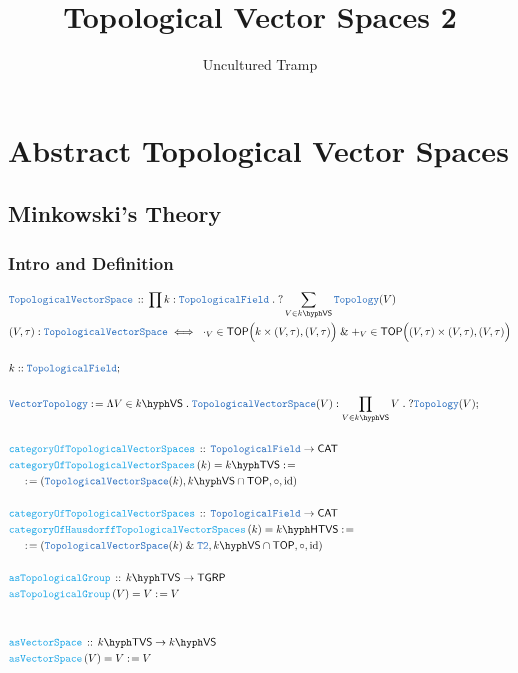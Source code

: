 \documentclass[12pt]{scrartcl}
\title{Topological Vector Spaces 2}
\author{Uncultured Tramp}
\newcommand{\TYPE}[1]{\textcolor{NavyBlue}{\mathtt{#1}}}
\newcommand{\FUNC}[1]{\textcolor{Cerulean}{\mathtt{#1}}}
\renewcommand{\.}{\; . \;}
\newcommand{\de}{: \kern 0.1pc =}
\newcommand{\Act}[1]{\left( #1 \right)}
\newcommand{\DeclareType}[2]{& \TYPE{#1} \, :: \, #2 \\}
\newcommand{\DefineType}[3]{& #1 : \TYPE{#2} \iff #3 \\}
\newcommand{\DeclareFunc}[2]{& \FUNC{#1} \, :: \, #2 \\}
\newcommand{\DefineNamedFunc}[4]{&  \FUNC{#1}\Act{#2} = #3 \de #4 \\}
\newcommand{\NewLine}{\\ & \kern 1pc}
\newcommand{\Page}[1]{ \begin{align*} #1 \end{align*}   }
\renewcommand{\And}{\; \& \;}
\DeclareMathOperator*{\id}{id}
\newcommand{\Conclude}[3]{& #1 \de #2 : #3; \\}
\newcommand{\CAT}{\mathsf{CAT}}
\newcommand{\Top}{\TYPE{Topology}}
\newcommand{\TOP}{\mathsf{TOP}}
\newcommand{\VS}[1]{#1\hyph\mathsf{VS}} %
\newcommand{\TGRP}{\mathsf{TGRP}}
\newcommand{\TopField}{\TYPE{TopologicalField}}
\newcommand{\TopVS}{\TYPE{TopologicalVectorSpace}}
\newcommand{\Vect}{\TYPE{Vector}}
\newcommand{\TVS}[1]{{#1}\hyph\mathsf{TVS}}
\newcommand{\HTVS}[1]{{#1}\hyph\mathsf{HTVS}}
\begin{document}
\maketitle
\newpage
\tableofcontents
\newpage
\section{Abstract Topological Vector Spaces}
\subsection{Minkowski's Theory}
\subsubsection{Intro and Definition}
\Page{
	\DeclareType{\TopVS}{\prod k : \TopField \. ? \sum_{V \in \VS{k}} \Top(V)}
	\DefineType{(V,\tau)}{\TopVS}{\
		\cdot_V \in \TOP\Big( k \times (V,\tau),(V,\tau)\Big) \And 
		+_V \in \TOP\Big( (V,\tau) \times (V,\tau),(V,\tau)\Big)
	}
	\\
	& k :: \TopField ;\\
	\\
	\Conclude{\Vect\Top}{\Lambda V \in \VS{k} \. \TopVS(V)}
	{\prod_{V \in \VS{k}} V \. ? \Top(V)} 
	\\
	\DeclareFunc{categoryOfTopologicalVectorSpaces}
	{
		\TopField \to \CAT
	}
	\DefineNamedFunc{categoryOfTopologicalVectorSpaces}{k}{\TVS{k}}
	{
		\NewLine \de		
		(\TopVS(k),\VS{k} \cap \TOP,\circ,\id)
	}
	\\
	\DeclareFunc{categoryOfTopologicalVectorSpaces}
	{
		\TopField \to \CAT
	}
	\DefineNamedFunc{categoryOfHausdorffTopologicalVectorSpaces}{k}{\HTVS{k}}
	{
		\NewLine \de		
		(\TopVS(k) \And \TYPE{T2},\VS{k} \cap \TOP,\circ,\id)
	}
	\\
	\DeclareFunc{asTopologicalGroup}
	{
		\TVS{k} \to \TGRP
	}
	\DefineNamedFunc{asTopologicalGroup}{V}{V}{V}
	\\
	\\
	\DeclareFunc{asVectorSpace}
	{
		\TVS{k} \to \VS{k}
	}
	\DefineNamedFunc{asVectorSpace}{V}{V}{V}
	\\
}
\newpage
\end{document}
